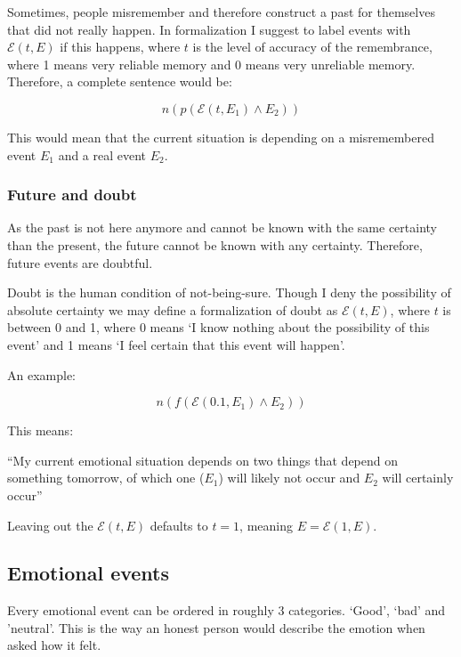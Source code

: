 \documentclass{scrartcl}
\begin{document}
Sometimes, people misremember and therefore construct a past for themselves that did not really happen. In formalization
I suggest to label events with $\mathcal{E}(t, E)$ if this happens, where $t$ is the level of accuracy of the
remembrance, where 1 means very reliable memory and 0 means very unreliable memory. Therefore, a complete sentence would be:

\begin{equation} n \left(p \left( \mathcal{E}(t, E_1) \wedge E_2 \right) \right) \end{equation}

This would mean that the current situation is depending on a misremembered event $E_1$ and a real event
$E_2$.

\subsubsection{Future and doubt}

As the past is not here anymore and cannot be known with the same certainty than the present, the future
cannot be known with any certainty. Therefore, future events are doubtful. 

Doubt is the human condition of not-being-sure. Though I deny the possibility of absolute certainty we
may define a formalization of doubt as $\mathcal{E}(t, E)$, where $t$ is between 0 and 1, where 0 means
`I know nothing about the possibility of this event' and 1 means `I feel certain that this event will happen'.

An example:

\begin{equation} n \left(f \left( \mathcal{E}(0.1, E_1) \wedge E_2 \right) \right) \end{equation}

This means:

``My current emotional situation depends on two things that depend on something tomorrow, of which one ($E_1$) will likely not
occur and $E_2$ will certainly occur''

Leaving out the $\mathcal{E}(t, E)$ defaults to $t = 1$, meaning $E = \mathcal{E}(1, E)$.

\subsection{Emotional events}

Every emotional event can be ordered in roughly 3 categories. `Good', `bad' and 'neutral'. This is the way an honest
person would describe the emotion when asked how it felt. 
\end{document}
